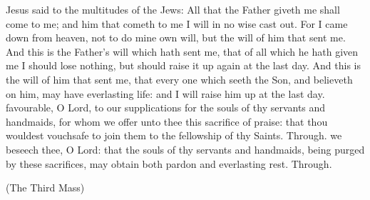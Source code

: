  Jesus said to the multitudes of the Jews: All that the Father giveth me shall come to me; and him that cometh to me I will in no wise cast out. For I came down from heaven, not to do mine own will, but the will of him that sent me. And this is the Father's will which hath sent me, that of all which he hath given me I should lose nothing, but should raise it up again at the last day. And this is the will of him that sent me, that every one which seeth the Son, and believeth on him, may have everlasting life: and I will raise him up at the last day.
\secret
{} favourable, O Lord, to our supplications for the souls of thy servants and handmaids, for whom we offer unto thee this sacrifice of praise: that thou wouldest vouchsafe to join them to the fellowship of thy Saints. Through.
\postcommunion
{} we beseech thee, O Lord: that the souls of thy servants and handmaids, being purged by these sacrifices, may obtain both pardon and everlasting rest. Through.

\centerline{\small{(The Third Mass)}}\label{AllSoulsIII}

